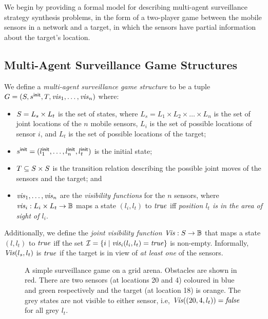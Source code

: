 We begin by providing a formal model for describing multi-agent surveillance strategy synthesis problems, in the form of a two-player game between the mobile sensors in a network and a target, in which the sensors have partial information about the target's location. 

\subsection{Multi-Agent Surveillance Game Structures}\label{sec:surveillance-games}
We define a \emph{multi-agent surveillance game structure} to be a tuple $G  = (S,s^{\mathsf{init}},T,\mathit{vis}_1,\dots,\mathit{vis}_n)$ where:
\begin{itemize}
\item $S = L_s \times L_t$ is the set of states, where $L_{s} = L_1 \times L_2 \times\dots \times L_n$ is the set of joint locations of the $n$ mobile sensors, $L_i$ is the set of possible locations of sensor $i$,  and $L_t$ is the set of possible locations of the target;
\item $s^{\mathsf{init}} = (l^{\mathsf{init}}_1,\ldots,l^{\mathsf{init}}_n,l_t^{\mathsf{init}})$ is the initial state;
\item $T \subseteq S \times S$ is the transition relation describing the possible joint moves of the sensors and the target; and
\item  $\mathit{vis}_1,\dots,\mathit{vis}_n$ are the \textit{visibility functions} for the $n$ sensors, where $\mathit{vis}_i: L_{i} \times L_t \to \mathbb{B}$ maps a state $(l_{i},l_t)$ to $\mathit{true}$ iff \emph{ position $l_t$ is in the area of sight of $l_i$}.
\end{itemize}

Additionally, we define the \emph{joint visibility function} $\mathit{Vis} : S \to \mathbb{B}$ that maps a state $(l,l_t)$ to $\mathit{true}$ iff the set $\mathcal{I} = \{i \mid \mathit{vis}_i(l_i,l_t) = \mathit{true}\}$ is non-empty. Informally, $\mathit{Vis}(l_s,l_t)$ is $\mathit{true}$ if the target is in view of \emph{at least one} of the sensors.

\begin{figure}
{}
\caption{A simple surveillance game on a grid arena. Obstacles are shown in red. There are two sensors (at locations 20 and 4) coloured in blue and green respectively and the target (at location 18) is orange. The grey states are not visible to either sensor, i.e, $\mathit{Vis}((20,4,l_t)) = \mathit{false}$ for all grey $l_t$.}
\label{fig:simple-surveillance-game}
\vspace{-.7cm}
\end{figure}


